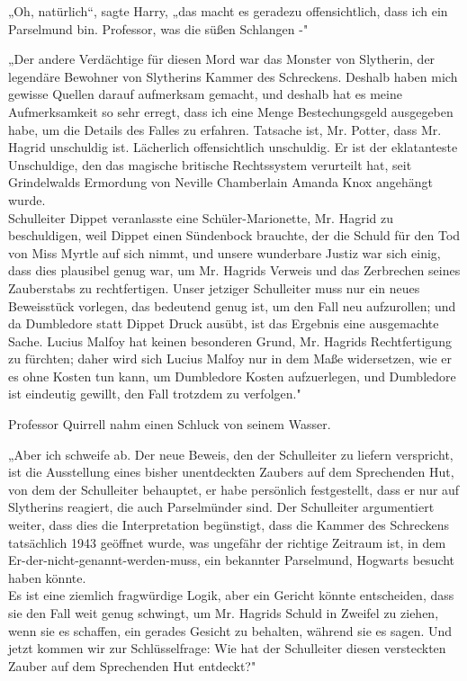 {„Oh, natürlich“, sagte Harry, „das macht es geradezu offensichtlich, dass ich ein Parselmund bin. Professor, was die süßen Schlangen -"

„Der andere Verdächtige für diesen Mord war das Monster von Slytherin, der legendäre Bewohner von Slytherins Kammer des Schreckens. Deshalb haben mich gewisse Quellen darauf aufmerksam gemacht, und deshalb hat es meine Aufmerksamkeit so sehr erregt, dass ich eine Menge Bestechungsgeld ausgegeben habe, um die Details des Falles zu erfahren. Tatsache ist, Mr. Potter, dass Mr. Hagrid unschuldig ist. Lächerlich offensichtlich unschuldig. Er ist der eklatanteste Unschuldige, den das magische britische Rechtssystem verurteilt hat, seit Grindelwalds Ermordung von Neville Chamberlain Amanda Knox angehängt wurde.\\ Schulleiter Dippet veranlasste eine Schüler-Marionette, Mr. Hagrid zu beschuldigen, weil Dippet einen Sündenbock brauchte, der die Schuld für den Tod von Miss Myrtle auf sich nimmt, und unsere wunderbare Justiz war sich einig, dass dies plausibel genug war, um Mr. Hagrids Verweis und das Zerbrechen seines Zauberstabs zu rechtfertigen. Unser jetziger Schulleiter muss nur ein neues Beweisstück vorlegen, das bedeutend genug ist, um den Fall neu aufzurollen; und da Dumbledore statt Dippet Druck ausübt, ist das Ergebnis eine ausgemachte Sache. Lucius Malfoy hat keinen besonderen Grund, Mr. Hagrids Rechtfertigung zu fürchten; daher wird sich Lucius Malfoy nur in dem Maße widersetzen, wie er es ohne Kosten tun kann, um Dumbledore Kosten aufzuerlegen, und Dumbledore ist eindeutig gewillt, den Fall trotzdem zu verfolgen."

Professor Quirrell nahm einen Schluck von seinem Wasser.

„Aber ich schweife ab. Der neue Beweis, den der Schulleiter zu liefern verspricht, ist die Ausstellung eines bisher unentdeckten Zaubers auf dem Sprechenden Hut, von dem der Schulleiter behauptet, er habe persönlich festgestellt, dass er nur auf Slytherins reagiert, die auch Parselmünder sind. Der Schulleiter argumentiert weiter, dass dies die Interpretation begünstigt, dass die Kammer des Schreckens tatsächlich 1943 geöffnet wurde, was ungefähr der richtige Zeitraum ist, in dem Er-der-nicht-genannt-werden-muss, ein bekannter Parselmund, Hogwarts besucht haben könnte.\\ Es ist eine ziemlich fragwürdige Logik, aber ein Gericht könnte entscheiden, dass sie den Fall weit genug schwingt, um Mr. Hagrids Schuld in Zweifel zu ziehen, wenn sie es schaffen, ein gerades Gesicht zu behalten, während sie es sagen. Und jetzt kommen wir zur Schlüsselfrage: Wie hat der Schulleiter diesen versteckten Zauber auf dem Sprechenden Hut entdeckt?"

}
